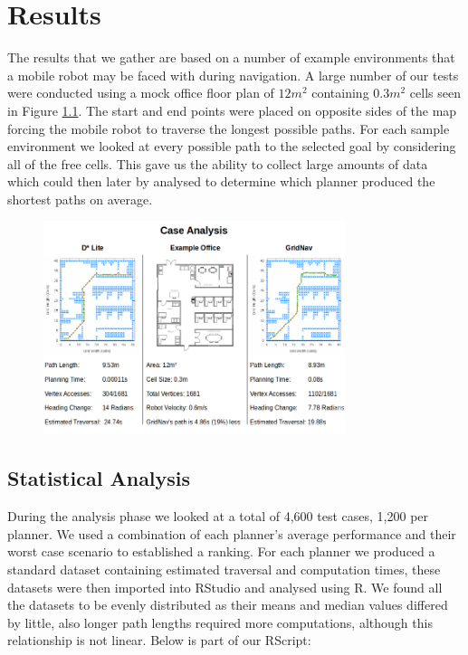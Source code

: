 \chapter{Results}


\noindent
The results that we gather are based on a number of example environments that a mobile robot may be faced with during navigation. A large number of our tests were conducted using a mock office floor plan of $12m^{2}$ containing $0.3m^{2}$ cells seen in Figure \ref{floor_plan}. The start and end points were placed on opposite sides of the map forcing the mobile robot to traverse the longest possible paths. For each sample environment we looked at every possible path to the selected goal by considering all of the free cells. This gave us the ability to collect large amounts of data which could then later by analysed to determine which planner produced the shortest paths on average.

\begin{figure}[htbp]

\center \includegraphics[width=250pt]{illustrations/floor_plan}\\
\caption{} 
\label{floor_plan}

\end{figure}

\section{Statistical Analysis}
\noindent
During the analysis phase we looked at a total of 4,600 test cases, 1,200 per planner. We used a combination of each planner's average performance and their worst case scenario to established a ranking. For each planner we produced a standard dataset containing estimated traversal and computation times, these datasets were then imported into RStudio and analysed using R. We found all the datasets to be evenly distributed as their means and median values differed by little, also longer path lengths required more computations, although this relationship is not linear. Below is part of our RScript: \\

